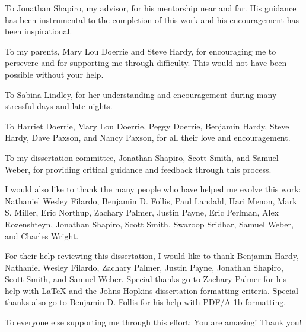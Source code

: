 \newcommand{\PERSONshap}[0]{Jonathan Shapiro}
\newcommand{\PERSONscottSmith}[0]{Scott Smith}
\newcommand{\PERSONsamWeber}[0]{Samuel Weber}
\newcommand{\PERSONjustin}[0]{Justin Payne}
\newcommand{\PERSONfollis}[0]{Benjamin D. Follis}
\newcommand{\PERSONlandahl}[0]{Paul Landahl}
\newcommand{\PERSONdad}[0]{Steve Hardy}
\newcommand{\PERSONmom}[0]{Mary Lou Doerrie}
\newcommand{\PERSONben}[0]{Benjamin Hardy}
\newcommand{\PERSONnwf}[0]{Nathaniel Wesley Filardo}
\newcommand{\PERSONzach}[0]{Zachary Palmer}
\newcommand{\PERSONswaroop}[0]{Swaroop Sridhar}

\begin{acknowledgment}
  
  
  To \PERSONshap{}, my advisor, for his mentorship near and far.
  His guidance has been instrumental to the completion of this work and his encouragement has been inspirational.

  To my parents, \PERSONmom{} and \PERSONdad{}, for encouraging me to persevere and for supporting me through difficulty.
  This would not have been possible without your help.

  To Sabina Lindley, for her understanding and encouragement during many stressful days and late nights.

  To
  Harriet Doerrie,
  \PERSONmom{},
  Peggy Doerrie,
  \PERSONben{},
  \PERSONdad{},
  Dave Paxson,
  and
  Nancy Paxson, for all their love and encouragement.

  To my dissertation committee,
  \PERSONshap{},
  \PERSONscottSmith{},
  and
  \PERSONsamWeber{},
  for providing critical guidance and feedback through this process.

  I would also like to thank the many people who have helped me evolve this work:
  \PERSONnwf{},
  \PERSONfollis{},
  \PERSONlandahl{},
  Hari Menon,
  Mark S. Miller,
  Eric Northup,
  \PERSONzach{},
  \PERSONjustin{},
  Eric Perlman,
  Alex Rozenshteyn,
  \PERSONshap{},
  \PERSONscottSmith{},
  \PERSONswaroop{},
  \PERSONsamWeber{},
  and
  Charles Wright.

  For their help reviewing this dissertation, I would like to thank
  \PERSONben{},
  \PERSONnwf{},
  \PERSONzach{},
  \PERSONjustin{},
  \PERSONshap{},
  \PERSONscottSmith{},
  and
  \PERSONsamWeber{}.
  Special thanks go to \PERSONzach{} for his help with LaTeX and the Johns Hopkins dissertation formatting criteria.
  Special thanks also go to \PERSONfollis{} for his help with PDF/A-1b formatting.

  To everyone else supporting me through this effort: You are amazing!  Thank you!
  
\end{acknowledgment}



